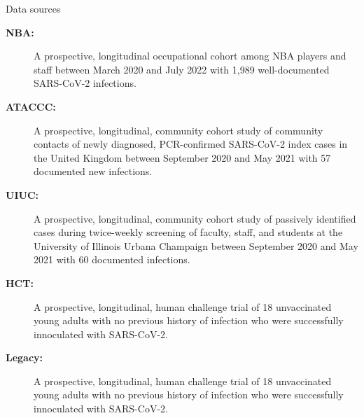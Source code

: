 \documentclass[9pt, aspectratio=169]{beamer}
\begin{document}
\begin{frame}{Data sources}
\begin{description}
    \item[\textbf{NBA:}] A prospective, longitudinal occupational cohort among NBA players and staff between March 2020 and July 2022 with 1,989 well-documented SARS-CoV-2 infections.
    \vfill
    \item[\textbf{ATACCC:}] A prospective, longitudinal, community cohort study of community contacts of newly diagnosed, PCR-confirmed SARS-CoV-2 index cases in the United Kingdom between September 2020 and May 2021 with 57 documented new infections.
    \vfill
    \item[\textbf{UIUC:}] A prospective, longitudinal, community cohort study of passively identified cases during twice-weekly screening of faculty, staff, and students at the University of Illinois Urbana Champaign between September 2020 and May 2021 with 60 documented infections.
    \vfill
    \item[\textbf{HCT:}] A prospective, longitudinal, human challenge trial of 18 unvaccinated young adults with no previous history of infection who were successfully innoculated with SARS-CoV-2. 
    \vfill
    \item[\textbf{Legacy:}] A prospective, longitudinal, human challenge trial of 18 unvaccinated young adults with no previous history of infection who were successfully innoculated with SARS-CoV-2. 
\end{description}
\end{frame}
\end{document}
